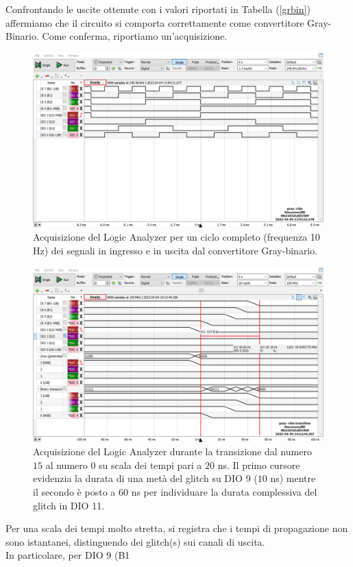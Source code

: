 \documentclass[10pt, a4paper, italian]{article}
\begin{document}
Confrontando le uscite ottenute con i valori riportati in Tabella (\ref{grbin}) affermiamo che il circuito si comporta correttamente come convertitore Gray-Binario. Come conferma, riportiamo un'acquisizione.\\
\begin{figure}[htb!]
    \centering
    \includegraphics[width=\textwidth]{graybin}
    \caption{Acquisizione del Logic Analyzer per un ciclo completo (frequenza 10 Hz) dei segnali in ingresso e in uscita dal convertitore Gray-binario.}
\end{figure}
\begin{figure}[htb!]
    \centering
    \includegraphics[width=\textwidth]{gray20ns.png}
    \caption{Acquisizione del Logic Analyzer durante la transizione dal numero $15$ al numero $0$ su scala dei tempi pari a $20$ ns. Il primo cursore evidenzia la durata di una metà del glitch su DIO 9 ($10$ ns) mentre il secondo è posto a $60$ ns per individuare la durata complessiva del glitch in DIO 11.}
\end{figure}
Per una scala dei tempi molto stretta, si registra che i tempi di propagazione non sono istantanei, distinguendo dei glitch(s) sui canali di uscita. \\
In particolare, per DIO 9 (B1 
\end{document}
